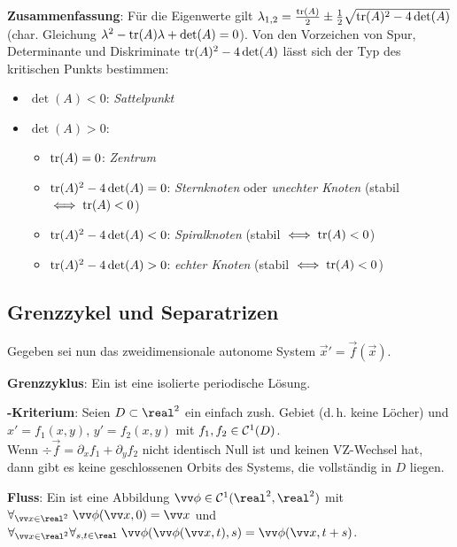 \textbf{Zusammenfassung}:
Für die Eigenwerte gilt
$\lambda_{1,2} = \frac{\text{tr}(A)}{2} \pm \frac{1}{2} \sqrt{\text{tr}(A)^2 - 4\det(A)}$
(char. Gleichung $\lambda^2 - \text{tr}(A) \lambda + \det(A) = 0$).
Von den Vorzeichen von Spur, Determinante und Diskriminate $\text{tr}(A)^2 - 4\det(A)$ lässt sich der
Typ des kritischen Punkts bestimmen:
\begin{itemize}
    \item
    $\det(A) < 0$: \emph{Sattelpunkt}

    \item
    $\det(A) > 0$:
    \begin{itemize}
        \item
        $\text{tr}(A) = 0$: \emph{Zentrum}

        \item
        $\text{tr}(A)^2 - 4\det(A) = 0$: \emph{Sternknoten} oder \emph{unechter Knoten}
        (stabil $\iff \text{tr}(A) < 0$)

        \item
        $\text{tr}(A)^2 - 4\det(A) < 0$: \emph{Spiralknoten} (stabil $\iff \text{tr}(A) < 0$)

        \item
        $\text{tr}(A)^2 - 4\det(A) > 0$: \emph{echter Knoten} (stabil $\iff \text{tr}(A) < 0$)
    \end{itemize}
\end{itemize}

\pagebreak

\subsection{%
    Grenzzykel und Separatrizen%
}

Gegeben sei nun das zweidimensionale autonome System $\vec{x}' = \vec{f}(\vec{x})$.

\textbf{Grenzzyklus}:
Ein  ist eine isolierte periodische Lösung.

\textbf{-Kriterium}:
Seien $D \subset \real^2$ ein einfach zush. Gebiet (d.\,h. keine Löcher) und\\
$x' = f_1(x, y)$, $y' = f_2(x, y)$ mit $f_1, f_2 \in \mathcal{C}^1(D)$.\\
Wenn $\div \vec{f} = \partial_x f_1 + \partial_y f_2$ nicht identisch Null ist und
keinen VZ-Wechsel hat, dann gibt es keine geschlossenen Orbits des Systems, die vollständig
in $D$ liegen.

\linie

\textbf{Fluss}:
Ein  ist eine Abbildung $\vec{\phi} \in \C^1(\real^2, \real^2)$ mit
$\forall_{\vec{x} \in \real^2}\; \vec{\phi}(\vec{x}, 0) = \vec{x}$ und\\
$\forall_{\vec{x} \in \real^2} \forall_{s, t \in \real}\;
\vec{\phi}(\vec{\phi}(\vec{x}, t), s) = \vec{\phi}(\vec{x}, t+s)$.

